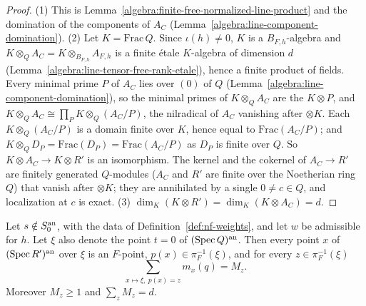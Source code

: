 \begin{proof}
(1) This is Lemma~\ref{algebra:finite-free-normalized-line-product} and the domination of the components of $A_C$
(Lemma~\ref{algebra:line-component-domination}). (2) Let $K=\mathrm{Frac}\,Q$. Since $\iota(h)\ne0$, $K$ is a
$B_{F,h}$-algebra and $K\otimes_QA_C=K\otimes_{B_{F,h}}A_{F,h}$ is a finite \'etale $K$-algebra of dimension $d$
(Lemma~\ref{algebra:line-tensor-free-rank-etale}), hence a finite product of fields. Every minimal prime $P$ of $A_C$
lies over $(0)$ of $Q$ (Lemma~\ref{algebra:line-component-domination}), so the minimal primes of $K\otimes_QA_C$ are the
$K\otimes P$, and $K\otimes_QA_C\cong\prod_PK\otimes_Q(A_C/P)$, the nilradical of $A_C$ vanishing after
$\otimes K$. Each $K\otimes_Q(A_C/P)$ is a domain finite over $K$, hence equal to $\mathrm{Frac}(A_C/P)$; and
$K\otimes_QD_P=\mathrm{Frac}(D_P)=\mathrm{Frac}(A_C/P)$ as $D_P$ is finite over $Q$. So $K\otimes A_C\to K\otimes R'$ is
an isomorphism. The kernel and the cokernel of $A_C\to R'$ are finitely generated $Q$-modules ($A_C$ and $R'$ are finite
over the Noetherian ring $Q$) that vanish after $\otimes K$; they are annihilated by a single $0\ne c\in Q$, and
localization at $c$ is exact. (3) $\dim_K(K\otimes R')=\dim_K(K\otimes A_C)=d$.
\end{proof}

\begin{lemma}\label{lem:nf-line-weights}
\leanok
{}
Let $s\notin S_0^{\mathrm{an}}$, with the data of Definition~\ref{def:nf-weights}, and let $w$ be admissible for $h$. Let $\xi$
also denote the point $t=0$ of $(\operatorname{Spec} Q)^{\mathrm{an}}$. Then every point $x$ of $(\operatorname{Spec} R')^{\mathrm{an}}$ over $\xi$ is an $F$-point,
$p(x)\in\pi_F^{-1}(\xi)$, and for every $z\in\pi_F^{-1}(\xi)$
\[
\sum_{x\mapsto\xi,\ p(x)=z}m_x(q)=M_z .
\]
Moreover $M_z\ge1$ and $\sum_zM_z=d$.
\end{lemma}

